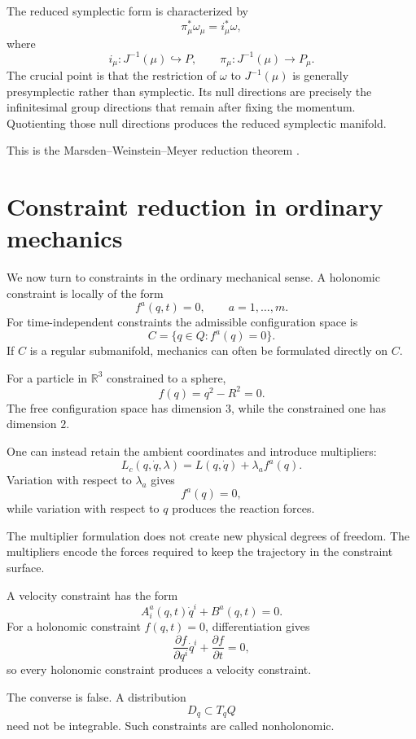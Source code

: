 The reduced symplectic form is characterized by
\[
        \pi_\mu^*\omega_\mu
        =
        i_\mu^*\omega,
\]
where
\[
        i_\mu:J^{-1}(\mu)\hookrightarrow P,
        \qquad
        \pi_\mu:J^{-1}(\mu)\to P_\mu.
\]
The crucial point is that the restriction of $\omega$ to
$J^{-1}(\mu)$ is generally presymplectic rather than symplectic.  Its null
directions are precisely the infinitesimal group directions that remain after
fixing the momentum.  Quotienting those null directions produces the reduced
symplectic manifold.

This is the Marsden--Weinstein--Meyer reduction theorem
\cite{MarsdenWeinstein1974}.

\section{Constraint reduction in ordinary mechanics}

We now turn to constraints in the ordinary mechanical sense.
A holonomic constraint is locally of the form
\[
        f^a(q,t)=0,
        \qquad a=1,\ldots,m.
\]
For time-independent constraints the admissible configuration space is
\[
        C=\{q\in Q:f^a(q)=0\}.
\]
If $C$ is a regular submanifold, mechanics can often be formulated directly
on $C$.

For a particle in $\mathbb{R}^3$ constrained to a sphere,
\[
        f(q)=q^2-R^2=0.
\]
The free configuration space has dimension $3$, while the constrained one has
dimension $2$.

One can instead retain the ambient coordinates and introduce multipliers:
\[
        L_c(q,\dot q,\lambda)
        =
        L(q,\dot q)+\lambda_a f^a(q).
\]
Variation with respect to $\lambda_a$ gives
\[
        f^a(q)=0,
\]
while variation with respect to $q$ produces the reaction forces.

The multiplier formulation does not create new physical degrees of freedom.
The multipliers encode the forces required to keep the trajectory in the
constraint surface.

A velocity constraint has the form
\[
        A^a_i(q,t)\dot q^i+B^a(q,t)=0.
\]
For a holonomic constraint $f(q,t)=0$, differentiation gives
\[
        \frac{\partial f}{\partial q^i}\dot q^i+
        \frac{\partial f}{\partial t}=0,
\]
so every holonomic constraint produces a velocity constraint.

The converse is false.  A distribution
\[
        D_q\subset T_qQ
\]
need not be integrable.  Such constraints are called nonholonomic.

